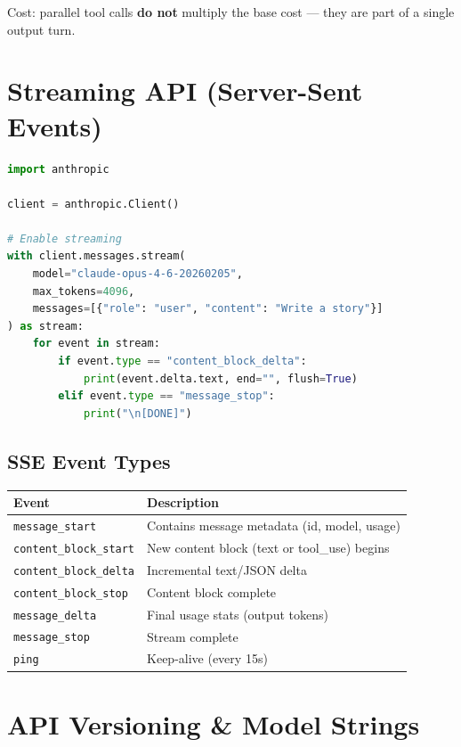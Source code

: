 \documentclass[11pt,a4paper]{article}
\begin{document}
Cost: parallel tool calls \textbf{do not} multiply the base cost --- they are part of a single output turn.

\section{Streaming API (Server-Sent Events)}

\begin{lstlisting}[language=Python, caption={Streaming with SSE}]
import anthropic

client = anthropic.Client()

# Enable streaming
with client.messages.stream(
    model="claude-opus-4-6-20260205",
    max_tokens=4096,
    messages=[{"role": "user", "content": "Write a story"}]
) as stream:
    for event in stream:
        if event.type == "content_block_delta":
            print(event.delta.text, end="", flush=True)
        elif event.type == "message_stop":
            print("\n[DONE]")
\end{lstlisting}

\subsection{SSE Event Types}

\begin{center}
\begin{tabular}{lL{9cm}}
\toprule
\textbf{Event} & \textbf{Description} \\
\midrule
\texttt{message\_start} & Contains message metadata (id, model, usage) \\
\texttt{content\_block\_start} & New content block (text or tool\_use) begins \\
\texttt{content\_block\_delta} & Incremental text/JSON delta \\
\texttt{content\_block\_stop} & Content block complete \\
\texttt{message\_delta} & Final usage stats (output tokens) \\
\texttt{message\_stop} & Stream complete \\
\texttt{ping} & Keep-alive (every 15s) \\
\bottomrule
\end{tabular}
\end{center}

\section{API Versioning \& Model Strings}
\end{document}
